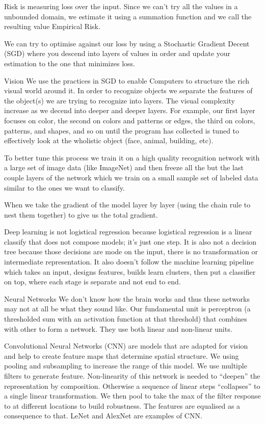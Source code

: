 \documentclass[3pt,landscape]{article}
\begin{document}
\begin{multicols}{3}
Risk is measuring loss over the input. Since we can’t try all the values in a unbounded domain, we estimate it using a summation function and we call the resulting value Empirical Risk.

We can try to optimise against our loss by using a Stochastic Gradient Decent (SGD) where you descend into layers of values in order and update your estimation to the one that minimizes loss. 

Vision
We use the practices in SGD to enable Computers to structure the rich visual world around it. In order to recognize objects we separate the features of the object(s) we are trying to recognize into layers. The visual complexity increase as we decend into deeper and deeper layers. For example, our first layer focuses on color, the second on colors and patterns or edges, the third on colors, patterns, and shapes, and so on until the program has collected is tuned to effectively look at the wholistic object (face, animal, building, etc). 

To better tune this process we train it on a high quality recognition network with a large set of image data (like ImageNet) and then freeze all the but the last couple layers of the network which we train on a small sample set of labeled data similar to the ones we want to classify. 

When we take the gradient of the model layer by layer (using the chain rule to nest them together) to give us the total gradient. 

Deep learning is not logistical regression because logistical regression is a linear classify that does not compose models; it’s just one step. It is also not a decision tree because those decisions are mode on the input, there is no transformation or intermediate representation. It also doesn’t follow the machine learning pipeline which takes an input, designs features, builds learn clusters, then put a classifier on top, where each stage is separate and not end to end.
 
Neural Networks
We don’t know how the brain works and thus these networks may not at all be what they sound like. Our fundamental unit is perceptron (a thresholded sum with an activation function at that threshold) that combines with other to form a network. They use both linear and non-linear units.

Convolutional Neural Networks (CNN) are models that are adapted for vision and help to create feature maps that determine spatial structure. We using pooling and subsampling to increase the range of this model. We use multiple filters to generate feature. Non-linearity of this network is needed to “deepen” the representation by composition. Otherwise a sequence of linear steps “collapses” to a single linear transformation.  We then pool to take the max of the filter response to at different locations to build robustness. The features are equalised as a consequence to that.  LeNet and AlexNet are examples of CNN. 
 

\end{multicols}
\end{document}
